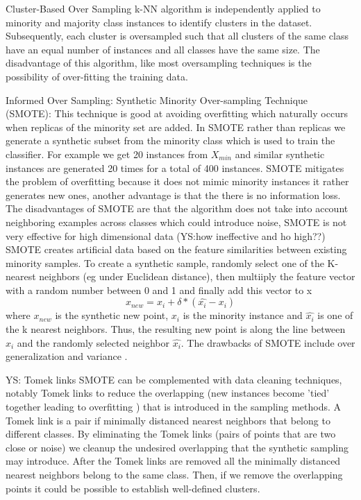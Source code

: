\documentclass[11pt]{article}
\begin{document}
Cluster-Based Over Sampling k-NN algorithm is independently applied to minority and majority class instances to identify clusters in the dataset. Subsequently, each cluster is oversampled such that all clusters of the same class have an equal number of instances and all classes have the same size. The disadvantage of this algorithm, like most oversampling techniques is the possibility of over-fitting the training data.  

Informed Over Sampling: Synthetic Minority Over-sampling Technique (SMOTE): This technique is good at avoiding overfitting which naturally occurs when replicas of the minority set are added. In SMOTE rather than replicas we generate a synthetic subset from the minority class which is used to train the classifier. For example we get 20 instances from $X_{min}$ and similar synthetic instances are generated 20 times for a total of 400 instances. SMOTE mitigates the problem of overfitting because it does not mimic minority instances it rather generates new ones, another advantage is that the there is no information loss.
The disadvantages of SMOTE are that the algorithm does not take into account neighboring examples across classes which could introduce noise, SMOTE is not very effective for high dimensional data (YS:how ineffective and ho high??)
SMOTE creates artificial data based on the feature similarities between existing minority samples. To create a synthetic sample, randomly select one of the K-nearest neighbors (eg under Euclidean distance), then multiiply the feature vector with a random number between 0 and 1 and finally add this vector to x
\begin{equation}
x_{new} =  x_i + \delta * (\hat{x_i} - x_i)
\end{equation}
where $x_{new}$ is the synthetic new point, $x_i$ is the minority instance and $\hat{x_i}$ is one of the k nearest neighbors. Thus, the resulting new point is along the line between $x_i$ and the randomly selected neighbor $\hat{x_i}$. The drawbacks of SMOTE include over generalization and variance \cite{wang2004imbalanced}.

YS: Tomek links
SMOTE can be complemented with data cleaning techniques, notably Tomek links \cite{tomek1976two} to reduce the overlapping (new instances become 'tied' together leading to overfitting \cite{mease2007boosted}) that is introduced in the sampling methods.
A Tomek link is a pair if minimally distanced nearest neighbors that belong to different classes. By eliminating the Tomek links (pairs of points that are two close or noise) we cleanup the undesired overlapping that the synthetic sampling may introduce. After the Tomek links are removed all the minimally distanced nearest neighbors belong to the same class. Then, if we remove the overlapping points it could be possible to establish well-defined clusters. 
\end{document}
